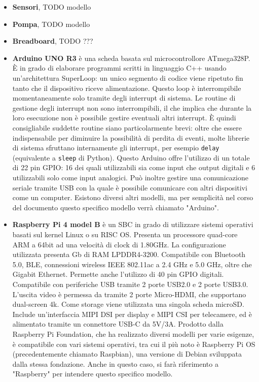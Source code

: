 \documentclass[12pt,a4paper,openright,twoside]{book}
\begin{document}
\begin{itemize}[noitemsep]
    \item \textbf{Sensori}, TODO modello
    \item \textbf{Pompa}, TODO modello
    \item \textbf{Breadboard}, TODO ???
    \item \textbf{Arduino UNO R3} è una scheda basata sul microcontrollore ATmega328P. È in grado di elaborare programmi scritti in linguaggio C++ usando un'architettura SuperLoop: un unico segmento di codice viene ripetuto fin tanto che il dispositivo riceve alimentazione. Questo loop è interrompibile momentaneamente solo tramite degli interrupt di sistema. Le routine di gestione degli interrupt non sono interrompibili, il che implica che durante la loro esecuzione non è possibile gestire eventuali altri interrupt. È quindi consigliabile suddette routine siano particolarmente brevi: oltre che essere indispensabile per diminuire la possibilità di perdita di eventi, molte librerie di sistema sfruttano internamente gli interrupt, per esempio \texttt{delay} (equivalente a \texttt{sleep} di Python).
    Questo Arduino offre l'utilizzo di un totale di 22 pin \ac{GPIO}: 16 dei quali utilizzabili sia come input che output digitali e 6 utilizzabili solo come input analogici. Può inoltre gestire una comunicazione seriale tramite USB con la quale è possibile comunicare con altri dispositivi come un computer.
    Esistono diversi altri modelli, ma per semplicità nel corso del documento questo specifico modello verrà chiamato "Arduino".
    \item \textbf{Raspberry Pi 4 model B} è un \ac{SBC} in grado di utilizzare sistemi operativi basati sul kernel Linux o su RISC OS. Presenta un processore quad-core ARM a 64bit ad una velocità di clock di 1.80GHz. La configurazione utilizzata presenta  Gb di RAM LPDDR4-3200. Compatibile con Bluetooth 5.0, BLE, connessioni wireless IEEE 802.11ac a 2.4 GHz e 5.0 GHz, oltre che Gigabit Ethernet. Permette anche l'utilizzo di 40 pin GPIO digitali. Compatibile con periferiche USB tramite 2 porte USB2.0 e 2 porte USB3.0. L'uscita video è permessa da tramite 2 porte Micro-HDMI, che supportano dual-screen 4k. Come storage viene utilizzata una singola scheda microSD. Include un'interfaccia MIPI DSI per display e MIPI CSI per telecamere, ed è alimentato tramite un connettore USB-C da 5V/3A. Prodotto dalla Raspberry Pi Foundation, che ha realizzato diversi modelli per varie esigenze, è compatibile con vari sistemi operativi, tra cui il più noto è Raspberry Pi OS (precedentemente chiamato Raspbian), una versione di Debian sviluppata dalla stessa fondazione. Anche in questo caso, si farà riferimento a "Raspberry" per intendere questo specifico modello.
\end{itemize}
\end{document}
